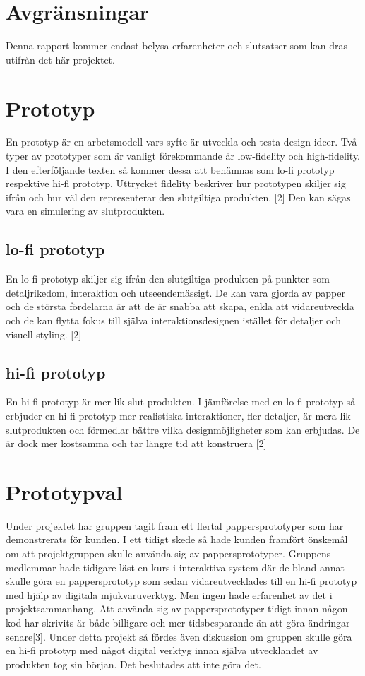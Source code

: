 \section{Avgränsningar}
Denna rapport kommer endast belysa erfarenheter och slutsatser som kan dras utifrån det här projektet.

\section{Prototyp} 
En prototyp är en arbetsmodell vars syfte är utveckla och testa design ideer. Två typer av prototyper som är vanligt förekommande är low-fidelity och high-fidelity. I den efterföljande texten så  kommer dessa att benämnas som lo-fi prototyp respektive hi-fi prototyp. Uttrycket fidelity beskriver hur prototypen skiljer sig ifrån och hur väl den representerar den slutgiltiga produkten. [2]  Den kan sägas vara en simulering av slutprodukten.    

\subsection{lo-fi prototyp} 
En lo-fi prototyp skiljer sig ifrån den slutgiltiga produkten på punkter som detaljrikedom, interaktion och utseendemässigt. De kan vara gjorda av papper och de största fördelarna är att de är snabba att skapa, enkla att vidareutveckla  och de kan flytta fokus till själva interaktionsdesignen istället för detaljer och visuell styling. [2]

\subsection{hi-fi prototyp}
En hi-fi prototyp är mer lik slut produkten.  I jämförelse med en lo-fi prototyp så erbjuder en hi-fi prototyp mer realistiska interaktioner, fler detaljer, är mera lik slutprodukten och förmedlar bättre vilka designmöjligheter som kan erbjudas. De är dock mer kostsamma och tar längre tid att konstruera  [2] 

\section{Prototypval}  
Under projektet har gruppen tagit fram ett flertal pappersprototyper som har demonstrerats för kunden. I ett tidigt skede så hade kunden framfört önskemål om att projektgruppen skulle använda sig av pappersprototyper. Gruppens medlemmar hade tidigare läst en kurs i interaktiva system där de bland annat skulle göra en pappersprototyp som sedan vidareutvecklades till en hi-fi prototyp med hjälp av digitala mjukvaruverktyg. Men ingen hade erfarenhet av det i projektsammanhang. Att använda sig av pappersprototyper tidigt innan någon kod har skrivits är både billigare och mer tidsbesparande än att göra ändringar senare[3]. Under detta projekt så fördes även diskussion om gruppen skulle göra en hi-fi prototyp med något digital verktyg innan själva utvecklandet av produkten tog sin början. Det beslutades att inte göra det.    
  
